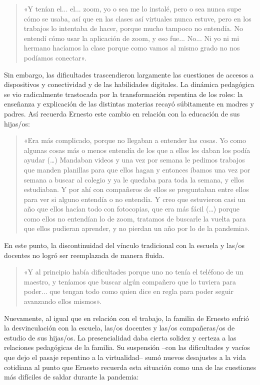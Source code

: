 \begin{quote}
«Y tenían el... el... zoom, yo o sea me lo instalé, pero o sea nunca supe cómo se usaba, así que en las clases así virtuales nunca estuve, pero en los trabajos lo intentaba de hacer, porque mucho tampoco no entendía. No entendí cómo usar la aplicación de zoom, y eso fue... No... Ni yo ni mi hermano hacíamos la clase porque como vamos al mismo grado no nos podíamos conectar».
\end{quote}

Sin embargo, las dificultades trascendieron largamente las cuestiones de accesos a dispositivos y conectividad y de las habilidades digitales. La dinámica pedagógica se vio radicalmente trastocada por la transformación repentina de los roles: la enseñanza y explicación de las distintas materias recayó súbitamente en madres y padres. Así recuerda Ernesto este cambio en relación con la educación de sus hijas/os:

\begin{quote}
«Era más complicado, porque no llegaban a entender las cosas. Yo como algunas cosas más o menos entendía de los que a ellos les daban los podía ayudar (\ldots) Mandaban videos y una vez por semana le pedimos trabajos que manden planillas para que ellos hagan y entonces íbamos una vez por semana a buscar al colegio y ya le quedaba para toda la semana, y ellos estudiaban. Y por ahí con compañeros de ellos se preguntaban entre ellos para ver si alguno entendía o no entendía. Y creo que estuvieron casi un año que ellos hacían todo con fotocopias, que era más fácil (\ldots) porque como ellos no entendían lo de zoom, tratamos de buscarle la vuelta para que ellos pudieran aprender, y no pierdan un año por lo de la pandemia».
\end{quote}

En este punto, la discontinuidad del vínculo tradicional con la escuela y las/os docentes no logró ser reemplazada de manera fluida.

\begin{quote}
«Y al principio había dificultades porque uno no tenía el teléfono de un maestro, y teníamos que buscar algún compañero que lo tuviera para poder... que tengan todo como quien dice en regla para poder seguir avanzando ellos mismos».
\end{quote}

Nuevamente, al igual que en relación con el trabajo, la familia de Ernesto sufrió la desvinculación con la escuela, las/os docentes y las/os compañeras/os de estudio de sus hijas/os. La presencialidad daba cierta solidez y certeza a las relaciones pedagógicas de la familia. Su suspensión --con las dificultades y vacíos que dejo el pasaje repentino a la virtualidad-- sumó nuevos desajustes a la vida cotidiana al punto que Ernesto recuerda esta situación como una de las cuestiones más difíciles de saldar durante la pandemia:

